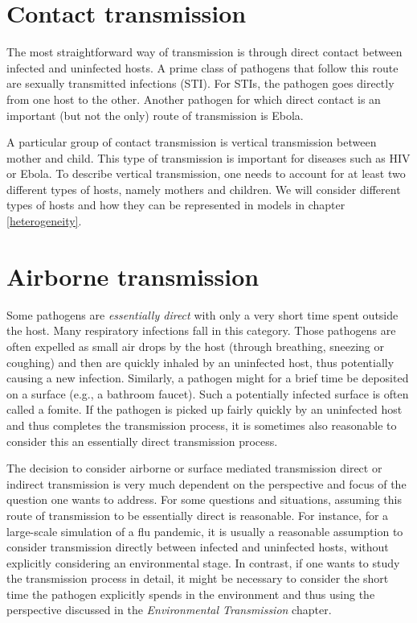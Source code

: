 \documentclass[]{book}
\theoremstyle{definition}
\theoremstyle{definition}
\theoremstyle{definition}
\theoremstyle{remark}
\begin{document}
\section{Contact transmission}\label{contact-transmission}

The most straightforward way of transmission is through direct contact
between infected and uninfected hosts. A prime class of pathogens that
follow this route are sexually transmitted infections (STI). For STIs,
the pathogen goes directly from one host to the other. Another pathogen
for which direct contact is an important (but not the only) route of
transmission is Ebola.

A particular group of contact transmission is vertical transmission
between mother and child. This type of transmission is important for
diseases such as HIV or Ebola. To describe vertical transmission, one
needs to account for at least two different types of hosts, namely
mothers and children. We will consider different types of hosts and how
they can be represented in models in chapter \ref{heterogeneity}.

\section{Airborne transmission}\label{airborne-transmission}

Some pathogens are \emph{essentially direct} with only a very short time
spent outside the host. Many respiratory infections fall in this
category. Those pathogens are often expelled as small air drops by the
host (through breathing, sneezing or coughing) and then are quickly
inhaled by an uninfected host, thus potentially causing a new infection.
Similarly, a pathogen might for a brief time be deposited on a surface
(e.g., a bathroom faucet). Such a potentially infected surface is often
called a fomite. If the pathogen is picked up fairly quickly by an
uninfected host and thus completes the transmission process, it is
sometimes also reasonable to consider this an essentially direct
transmission process.

The decision to consider airborne or surface mediated transmission
direct or indirect transmission is very much dependent on the
perspective and focus of the question one wants to address. For some
questions and situations, assuming this route of transmission to be
essentially direct is reasonable. For instance, for a large-scale
simulation of a flu pandemic, it is usually a reasonable assumption to
consider transmission directly between infected and uninfected hosts,
without explicitly considering an environmental stage. In contrast, if
one wants to study the transmission process in detail, it might be
necessary to consider the short time the pathogen explicitly spends in
the environment and thus using the perspective discussed in the
\emph{Environmental Transmission} chapter.
\end{document}
